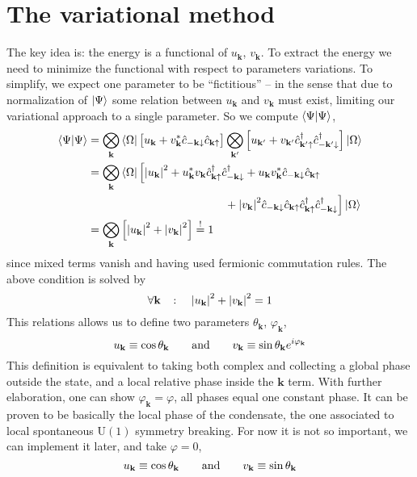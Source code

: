 \section{The variational method}\label{sec:the variational method}

The key idea is: the energy is a functional of $u_\mathbf{k}$, $v_\mathbf{k}$. To extract the energy we need to minimize the functional with respect to parameters variations. To simplify, we expect one parameter to be ``fictitious'' -- in the sense that due to normalization of $\ket{\Psi}$ some relation between $u_\mathbf{k}$ and $v_\mathbf{k}$ must exist, limiting our variational approach to a single parameter. So we compute $\braket{\Psi}{\Psi}$,
\[
\begin{aligned}
	\braket{\Psi}{\Psi} &= \bigotimes_\mathbf{k} \bra{\Omega} \lrS{
		\vphantom{c^\dagger}
		u_\mathbf{k} + v_\mathbf{k}^* \hat{c}_{-\mathbf{k}\downarrow} \hat{c}_{\mathbf{k}\uparrow}
	} \bigotimes_{\mathbf{k}'} \lrS{
		u_{\mathbf{k}'} + v_{\mathbf{k}'} \hat{c}_{\mathbf{k}'\uparrow}^\dagger \hat{c}_{-\mathbf{k}'\downarrow}^\dagger
	} \ket{\Omega} \\
	&= \bigotimes_\mathbf{k} \bra{\Omega} \Big[
		\abs{u_\mathbf{k}}^2 + u_\mathbf{k}^* v_\mathbf{k} \hat{c}_{\mathbf{k}\uparrow}^\dagger \hat{c}_{-\mathbf{k}\downarrow}^\dagger + u_\mathbf{k} v_\mathbf{k}^* \hat{c}_{-\mathbf{k}\downarrow} \hat{c}_{\mathbf{k}\uparrow} \\
	&\hspace{12.12em} + \abs{v_\mathbf{k}}^2 \hat{c}_{-\mathbf{k}\downarrow} \hat{c}_{\mathbf{k}\uparrow} \hat{c}_{\mathbf{k}\uparrow}^\dagger \hat{c}_{-\mathbf{k}\downarrow}^\dagger
	\Big] \ket{\Omega} \\
	&= \bigotimes_\mathbf{k} \lrS{
		\vphantom{c^\dagger}
		\abs{u_\mathbf{k}}^2 + \abs{v_\mathbf{k}}^2
	} \imp 1
\end{aligned}
\]
since mixed terms vanish and having used fermionic commutation rules. The above condition is solved by
\[
	\forall\mathbf{k}
	\quad\colon\quad
	\abs{u_\mathbf{k}}^2 + \abs{v_\mathbf{k}}^2 = 1
\]
This relations allows us to define two parameters $\theta_\mathbf{k}$, $\varphi_\mathbf{k}$,
\[
	u_\mathbf{k} \equiv \cos\theta_\mathbf{k}
	\quad\qq{and}\quad
	v_\mathbf{k} \equiv \sin\theta_\mathbf{k} e^{i\varphi_\mathbf{k}}
\]
This definition is equivalent to taking both complex and collecting a global phase outside the state, and a local relative phase inside the $\mathbf{k}$ term. With further elaboration, one can show $\varphi_\mathbf{k} = \varphi$, all phases equal one constant phase. It can be proven to be basically the local phase of the condensate, the one associated to local spontaneous $\mathrm{U}(1)$ symmetry breaking. For now it is not so important, we can implement it later, and take $\varphi=0$,
\begin{equation}\label{eq:u,v normalization conditions sin cos}
	u_\mathbf{k} \equiv \cos\theta_\mathbf{k}
	\quad\qq{and}\quad
	v_\mathbf{k} \equiv \sin\theta_\mathbf{k}
\end{equation}

